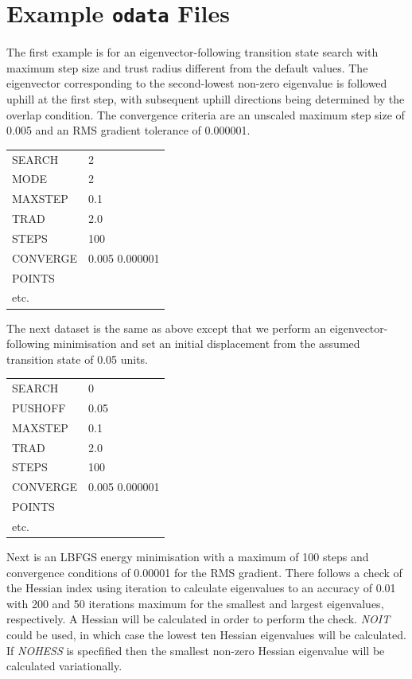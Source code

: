 \documentclass[12pt,a4paper,dvips]{article}
\begin{document}
\section{Example {\tt odata} Files}
\label{sec:examples}
The first example is for an eigenvector-following 
transition state search with maximum step size and  trust radius different from the default
values. The eigenvector corresponding to the second-lowest non-zero eigenvalue is followed
uphill at the first step, with subsequent uphill directions being determined by the overlap
condition. The convergence criteria are an unscaled maximum step size of 0.005 and an RMS
gradient tolerance of 0.000001. 

\medskip
\begin{tabular}{ll}
 SEARCH & 2  \\
 MODE & 2 \\
 MAXSTEP & 0.1  \\
 TRAD & 2.0  \\
 STEPS & 100  \\
 CONVERGE & 0.005 0.000001  \\
 POINTS  \\
 etc.  \\
\end{tabular}
\medskip

\noindent The next dataset is the same as above except that we perform an eigenvector-following
minimisation and set an initial displacement from the assumed transition state of
0.05 units.

\medskip
\begin{tabular}{ll}
 SEARCH & 0 \\
 PUSHOFF & 0.05 \\
 MAXSTEP & 0.1 \\
 TRAD & 2.0 \\
 STEPS & 100 \\
 CONVERGE & 0.005 0.000001 \\
 POINTS \\
 etc. \\
\end{tabular}
\medskip

\noindent Next is an LBFGS energy minimisation with a maximum of 100 steps and
convergence conditions of 0.00001 for the RMS gradient.
There follows a check of the Hessian index using iteration to calculate 
eigenvalues to an accuracy of 0.01 with 200 and 50 iterations maximum for the smallest
and largest eigenvalues, respectively. A Hessian will be calculated in order to 
perform the check. {\it NOIT\/} could be used, in which case the lowest ten Hessian
eigenvalues will be calculated. If {\it NOHESS\/} is specfified then the smallest
non-zero Hessian eigenvalue will be calculated variationally.
\end{document}
